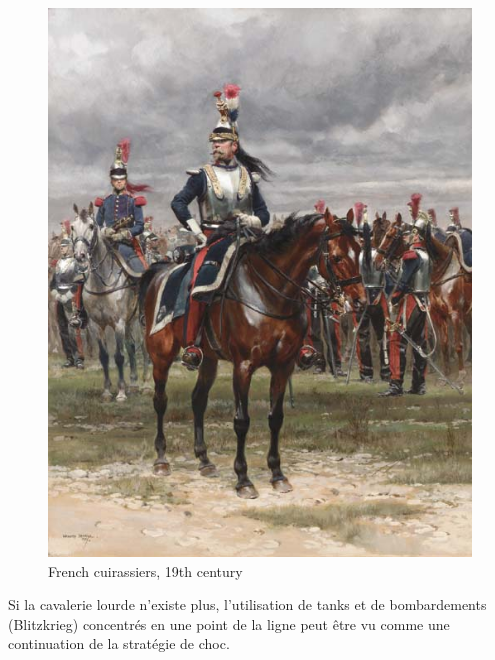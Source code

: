 \documentclass{article}
\begin{document}
\begin{center}
\begin{figure}[H]
\begin{minipage}[H]{0.45\linewidth}
	\includegraphics[width=\linewidth]{../ressources/cuirassiers}
	\caption{French cuirassiers, 19th century \cite{heavy_cavalry}}
\end{minipage}
\hfill
\end{figure}
\end{center}
Si la cavalerie lourde n'existe plus, l'utilisation de tanks et de bombardements (Blitzkrieg) concentrés en une point de la ligne peut être vu comme une continuation de la stratégie de choc.
\end{document}
